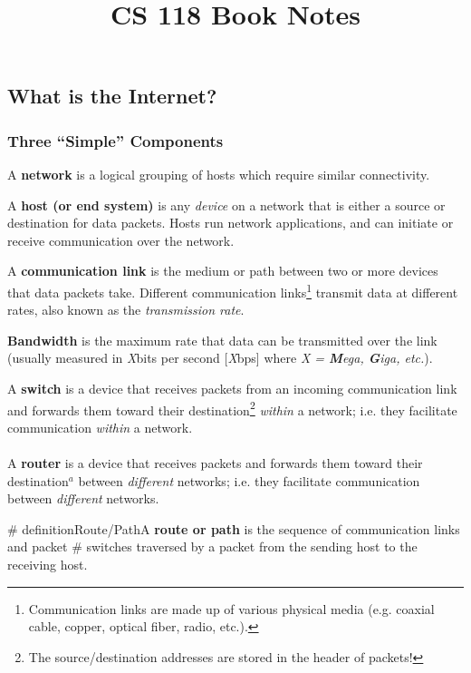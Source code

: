 \documentclass{report}
\title{CS 118 Book Notes}
\date{}
\newcommand{\definition}[2]{\begin{tcolorbox}[title={Definition: #1}]{#2}\end{tcolorbox}}
\begin{document}
\maketitle

\tableofcontents
\newpage


\chapter{}
\section{What is the Internet?}
\subsection{Three ``Simple'' Components}
\definition{Network}{A \textbf{network} is a logical grouping of hosts which require
  similar connectivity.}

\definition{Host/End System}{A \textbf{host (or end system)} is any \textit{device} on a network
  that is either a source or destination for data packets. Hosts run network applications, and can
  initiate or receive communication over the network.}

\definition{Communication Link}{A \textbf{communication link} is the medium or path between two or
  more devices that data packets take. Different communication links\footnote{Communication links are
    made up of various physical media (e.g. coaxial cable, copper, optical fiber, radio, etc.).}
  transmit data at different rates, also known as the \textit{transmission rate}.

\definition{Bandwidth}{\textbf{Bandwidth} is the maximum rate that data
  can be transmitted over the link (usually measured in \textit{X}bits per second [\textit{X}bps]
  where \textit{X = \textbf{M}ega, \textbf{G}iga, etc.}).}}

\definition{Switch and Router}{A \textbf{switch} is a device that
  receives packets from an incoming communication link and forwards them toward their
  destination\footnote{The source/destination addresses are stored in the header of packets!}
  \textit{within} a network; i.e. they facilitate communication \textit{within} a network. \\ \\
  A \textbf{router} is a device that receives packets and forwards them toward their
  destination$^{\textit{a}}$ between \textit{different} networks; i.e. they facilitate communication
  between \textit{different} networks.

\# definition{Route/Path}{A \textbf{route or path} is the sequence of communication links and packet
 #  switches traversed by a packet from the sending host to the receiving host.}}
\end{document}
